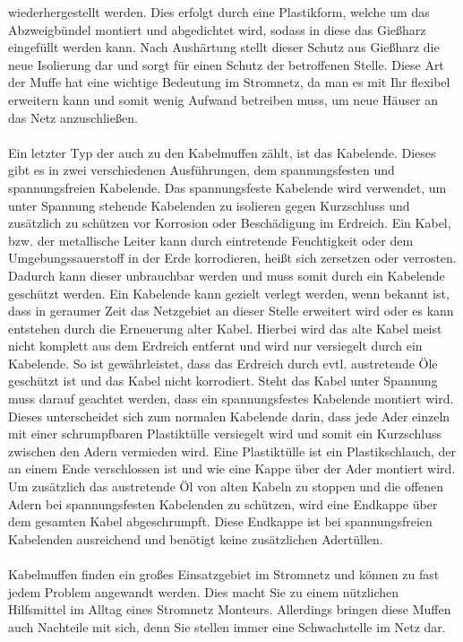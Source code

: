 wiederhergestellt werden. Dies erfolgt durch eine Plastikform, welche um das Abzweigbündel montiert und abgedichtet wird, sodass in diese das Gießharz 
eingefüllt werden kann. Nach Aushärtung stellt dieser Schutz aus Gießharz die neue Isolierung dar und sorgt für einen Schutz der betroffenen Stelle. 
Diese Art der Muffe hat eine wichtige Bedeutung im Stromnetz, da man es mit Ihr flexibel erweitern kann und somit wenig Aufwand betreiben muss, um \zB 
neue Häuser an das Netz anzuschließen.\\\\
Ein letzter Typ der auch zu den Kabelmuffen zählt, ist das Kabelende. Dieses gibt es in zwei verschiedenen Ausführungen, dem spannungsfesten und 
spannungsfreien Kabelende. Das spannungsfeste Kabelende wird verwendet, um unter Spannung stehende Kabelenden zu isolieren gegen Kurzschluss und zusätzlich 
zu schützen vor Korrosion oder Beschädigung im Erdreich. Ein Kabel, bzw. der metallische Leiter kann durch eintretende Feuchtigkeit oder dem 
Umgebungssauerstoff in der Erde korrodieren, heißt sich zersetzen oder verrosten. Dadurch kann dieser unbrauchbar werden und muss somit durch ein Kabelende 
geschützt werden. Ein Kabelende kann gezielt verlegt werden, wenn \zB bekannt ist, dass in geraumer Zeit das Netzgebiet an dieser Stelle erweitert wird 
oder es kann entstehen durch die Erneuerung alter Kabel. Hierbei wird das alte Kabel meist nicht komplett aus dem Erdreich entfernt und wird nur versiegelt 
durch ein Kabelende. So ist gewährleistet, dass das Erdreich durch evtl. austretende Öle geschützt ist und das Kabel nicht korrodiert. Steht das Kabel 
unter Spannung muss darauf geachtet werden, dass ein spannungsfestes Kabelende montiert wird. Dieses unterscheidet sich zum normalen Kabelende darin, 
dass jede Ader einzeln mit einer schrumpfbaren Plastiktülle versiegelt wird und somit ein Kurzschluss zwischen den Adern vermieden wird. Eine Plastiktülle 
ist ein Plastikschlauch, der an einem Ende verschlossen ist und wie eine Kappe über der Ader montiert wird. Um zusätzlich das austretende Öl von alten 
Kabeln zu stoppen und die offenen Adern bei \zB spannungsfesten Kabelenden zu schützen, wird eine Endkappe über dem gesamten Kabel abgeschrumpft. Diese 
Endkappe ist bei spannungsfreien Kabelenden ausreichend und benötigt keine zusätzlichen Adertüllen.\\\\
Kabelmuffen finden ein großes Einsatzgebiet im Stromnetz und können zu fast jedem Problem angewandt werden. Dies macht Sie zu einem nützlichen Hilfsmittel
im Alltag eines Stromnetz Monteurs. Allerdings bringen diese Muffen auch Nachteile mit sich, denn Sie stellen immer eine Schwachstelle im Netz dar. 
